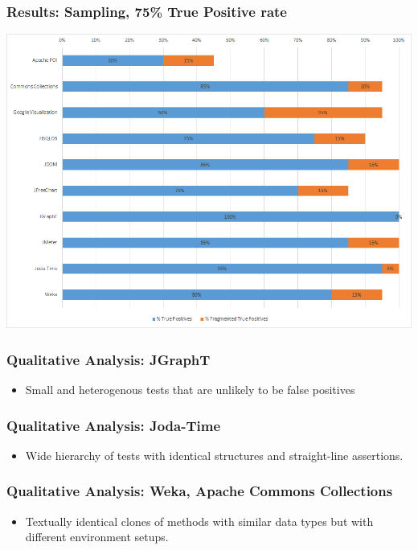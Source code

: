 \documentclass{beamer}
\begin{document}
\begin{frame}
\frametitle{Results: Sampling, 75\% True Positive rate} {
   \includegraphics[width=\textwidth, keepaspectratio=true]{images/percent_true_positives.png}
   }
\end{frame}


\begin{frame}
\frametitle{Qualitative Analysis: JGraphT} {
   \Large
     \begin{itemize}
        \item Small and heterogenous tests that are unlikely to be false positives
     \end{itemize}
}
\end{frame}

\begin{frame}
\frametitle{Qualitative Analysis: Joda-Time} {
   \Large
     \begin{itemize}
        \item Wide hierarchy of tests with identical structures and straight-line assertions.
     \end{itemize}
}
\end{frame}

\begin{frame}
\frametitle{Qualitative Analysis: Weka, Apache Commons Collections} {
   \Large
   \begin{itemize}
      \item Textually identical clones of methods with similar data types
         but with different environment setups.
   \end{itemize}    
}
\end{frame}
\end{document}
